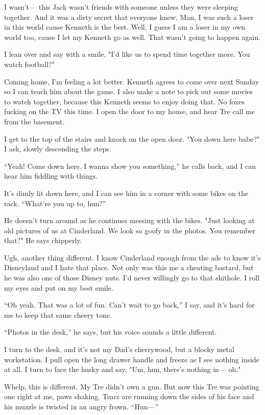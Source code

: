 I wasn't--- this Jack wasn't friends with someone unless they were
sleeping together. And it was a dirty secret that everyone knew. Man, I
was such a loser in this world cause Kenneth is the best. Well, I guess
I am a loser in my own world too, cause I let my Kenneth go as well.
That wasn't going to happen again.

I lean over and say with a smile, "I'd like us to spend time together
more. You watch football?"

Coming home, I'm feeling a lot better. Kenneth agrees to come over next
Sunday so I can teach him about the game. I also make a note to pick out
some movies to watch together, because this Kenneth seems to enjoy doing
that. No foxes fucking on the TV this time. I open the door to my house,
and hear Tre call me from the basement.

I get to the top of the stairs and knock on the open door. "You down
here babe?" I ask, slowly descending the steps.

``Yeah! Come down here. I wanna show you something,'' he calls back, and I
can hear him fiddling with things.

It's dimly lit down here, and I can see him in a corner with some bikes
on the rack. ``What're you up to, hun?''

He doesn't turn around as he continues messing with the bikes. "Just
looking at old pictures of us at Cinderland. We look so goofy in the
photos. You remember that?" He says chipperly.

Ugh, another thing different. I know Cinderland enough from the ads to
know it's Disneyland and I hate that place. Not only was this me a
cheating bastard, but he was also one of those Disney nuts. I'd never
willingly go to that shithole. I roll my eyes and put on my best smile.

``Oh yeah. That was a lot of fun. Can't wait to go back,'' I say, and it's
hard for me to keep that same cheery tone.

``Photos in the desk,'' he says, but his voice sounds a little different.

I turn to the desk, and it's not my Dad's cherrywood, but a blocky metal
workstation. I pull open the long drawer handle and freeze as I see
nothing inside at all. I turn to face the husky and say, "Um, hun,
there's nothing in--- oh."

Whelp, this is different. My Tre didn't own a gun. But now this Tre was
pointing one right at me, paws shaking. Tears are running down the sides
of his face and his muzzle is twisted in an angry frown. ``Hun---''

